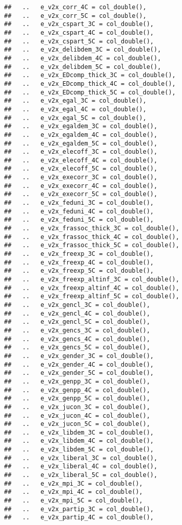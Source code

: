 \documentclass[
]{article}
\begin{document}
\begin{verbatim}
##   ..   e_v2x_corr_4C = col_double(),
##   ..   e_v2x_corr_5C = col_double(),
##   ..   e_v2x_cspart_3C = col_double(),
##   ..   e_v2x_cspart_4C = col_double(),
##   ..   e_v2x_cspart_5C = col_double(),
##   ..   e_v2x_delibdem_3C = col_double(),
##   ..   e_v2x_delibdem_4C = col_double(),
##   ..   e_v2x_delibdem_5C = col_double(),
##   ..   e_v2x_EDcomp_thick_3C = col_double(),
##   ..   e_v2x_EDcomp_thick_4C = col_double(),
##   ..   e_v2x_EDcomp_thick_5C = col_double(),
##   ..   e_v2x_egal_3C = col_double(),
##   ..   e_v2x_egal_4C = col_double(),
##   ..   e_v2x_egal_5C = col_double(),
##   ..   e_v2x_egaldem_3C = col_double(),
##   ..   e_v2x_egaldem_4C = col_double(),
##   ..   e_v2x_egaldem_5C = col_double(),
##   ..   e_v2x_elecoff_3C = col_double(),
##   ..   e_v2x_elecoff_4C = col_double(),
##   ..   e_v2x_elecoff_5C = col_double(),
##   ..   e_v2x_execorr_3C = col_double(),
##   ..   e_v2x_execorr_4C = col_double(),
##   ..   e_v2x_execorr_5C = col_double(),
##   ..   e_v2x_feduni_3C = col_double(),
##   ..   e_v2x_feduni_4C = col_double(),
##   ..   e_v2x_feduni_5C = col_double(),
##   ..   e_v2x_frassoc_thick_3C = col_double(),
##   ..   e_v2x_frassoc_thick_4C = col_double(),
##   ..   e_v2x_frassoc_thick_5C = col_double(),
##   ..   e_v2x_freexp_3C = col_double(),
##   ..   e_v2x_freexp_4C = col_double(),
##   ..   e_v2x_freexp_5C = col_double(),
##   ..   e_v2x_freexp_altinf_3C = col_double(),
##   ..   e_v2x_freexp_altinf_4C = col_double(),
##   ..   e_v2x_freexp_altinf_5C = col_double(),
##   ..   e_v2x_gencl_3C = col_double(),
##   ..   e_v2x_gencl_4C = col_double(),
##   ..   e_v2x_gencl_5C = col_double(),
##   ..   e_v2x_gencs_3C = col_double(),
##   ..   e_v2x_gencs_4C = col_double(),
##   ..   e_v2x_gencs_5C = col_double(),
##   ..   e_v2x_gender_3C = col_double(),
##   ..   e_v2x_gender_4C = col_double(),
##   ..   e_v2x_gender_5C = col_double(),
##   ..   e_v2x_genpp_3C = col_double(),
##   ..   e_v2x_genpp_4C = col_double(),
##   ..   e_v2x_genpp_5C = col_double(),
##   ..   e_v2x_jucon_3C = col_double(),
##   ..   e_v2x_jucon_4C = col_double(),
##   ..   e_v2x_jucon_5C = col_double(),
##   ..   e_v2x_libdem_3C = col_double(),
##   ..   e_v2x_libdem_4C = col_double(),
##   ..   e_v2x_libdem_5C = col_double(),
##   ..   e_v2x_liberal_3C = col_double(),
##   ..   e_v2x_liberal_4C = col_double(),
##   ..   e_v2x_liberal_5C = col_double(),
##   ..   e_v2x_mpi_3C = col_double(),
##   ..   e_v2x_mpi_4C = col_double(),
##   ..   e_v2x_mpi_5C = col_double(),
##   ..   e_v2x_partip_3C = col_double(),
##   ..   e_v2x_partip_4C = col_double(),

\end{verbatim}
\end{document}
